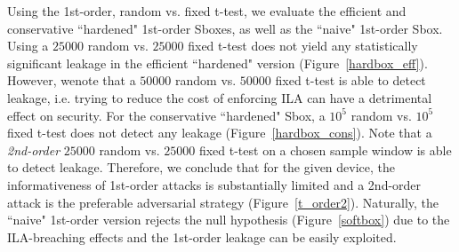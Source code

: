 
Using the 1st-order, random vs. fixed t-test, we evaluate the efficient and conservative ``hardened" 1st-order Sboxes, as well as the ``naive" 1st-order Sbox. Using a $25000$ random vs. $25000$ fixed t-test does not yield any statistically significant leakage in the efficient ``hardened" version (Figure~\ref{hardbox_eff}). However, wenote that a $50000$ random vs. $50000$ fixed t-test is able to detect leakage, i.e. trying to reduce the cost of enforcing ILA can have a detrimental effect on security. For the conservative ``hardened" Sbox, a $10^{5}$ random vs. $10^{5}$ fixed t-test does not detect any leakage (Figure~\ref{hardbox_cons}). Note that a \emph{2nd-order} $25000$ random vs. $25000$ fixed t-test on a chosen sample window is able to detect leakage. Therefore, we conclude that for the given device, the informativeness of 1st-order attacks is substantially limited and a 2nd-order attack is the preferable adversarial strategy (Figure~\ref{t_order2}). Naturally, the ``naive" 1st-order version rejects the null hypothesis (Figure~\ref{softbox}) due to the ILA-breaching effects and the 1st-order leakage can be easily exploited.
